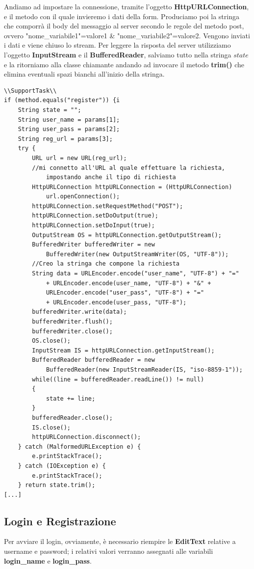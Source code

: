 \documentclass[a4paper, 50pt, twoside]{article}
\begin{document}
Andiamo ad impostare la connessione, tramite l'oggetto \textbf{HttpURLConnection}, e il metodo con il quale invieremo i dati della form. Produciamo poi la stringa che comporrà il body del messaggio al server secondo le regole del metodo post, ovvero "nome\_variabile1"=valore1 \&  "nome\_variabile2"=valore2. Vengono inviati i dati e viene chiuso lo stream. Per leggere la risposta del server utilizziamo l'oggetto \textbf{InputStream} e il \textbf{BufferedReader}, salviamo tutto nella stringa $state$ e la ritorniamo alla classe chiamante andando ad invocare il metodo \textbf{trim()} che elimina eventuali spazi bianchi all'inizio della stringa.
\begin{lstlisting}
\\SupportTask\\
if (method.equals("register")) {i
	String state = "";
	String user_name = params[1];
	String user_pass = params[2];
	String reg_url = params[3];
	try {
		URL url = new URL(reg_url);
		//mi connetto all'URL al quale effettuare la richiesta, 
			impostando anche il tipo di richiesta
		HttpURLConnection httpURLConnection = (HttpURLConnection) 
			url.openConnection();
		httpURLConnection.setRequestMethod("POST");
		httpURLConnection.setDoOutput(true);
		httpURLConnection.setDoInput(true);
		OutputStream OS = httpURLConnection.getOutputStream();
		BufferedWriter bufferedWriter = new 
			BufferedWriter(new OutputStreamWriter(OS, "UTF-8"));
		//Creo la stringa che compone la richiesta
		String data = URLEncoder.encode("user_name", "UTF-8") + "=" 
			+ URLEncoder.encode(user_name, "UTF-8") + "&" +
			URLEncoder.encode("user_pass", "UTF-8") + "=" 
			+ URLEncoder.encode(user_pass, "UTF-8");
		bufferedWriter.write(data);
		bufferedWriter.flush();
		bufferedWriter.close();
		OS.close();
		InputStream IS = httpURLConnection.getInputStream();
		BufferedReader bufferedReader = new 
			BufferedReader(new InputStreamReader(IS, "iso-8859-1"));
		while((line = bufferedReader.readLine()) != null)
		{
			state += line;
		}
		bufferedReader.close();
		IS.close();
		httpURLConnection.disconnect();
	} catch (MalformedURLException e) {
		e.printStackTrace();
	} catch (IOException e) {
		e.printStackTrace();
	} return state.trim();
[...]
\end{lstlisting}
\subsection{Login e Registrazione}
Per avviare il login, ovviamente, è necessario riempire le \textbf{EditText} relative a username e password; i relativi valori verranno assegnati alle variabili \textbf{login\_name} e \textbf{login\_pass}.
\end{document}
